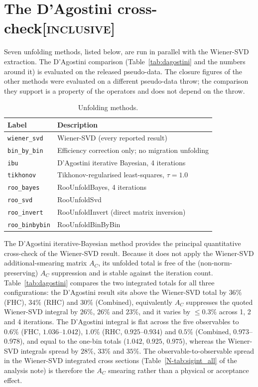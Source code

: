 \documentclass[11pt,a4paper]{article}
\newcommand{\noteref}[2]{#1~\ref{N-#2} of the analysis note}
\newcommand{\scopetag}[1]{\hfill{\normalfont\small\textsc{[#1]}}}
\begin{document}
\section[The D'Agostini cross-check]{The D'Agostini cross-check\scopetag{inclusive}}
\label{sec:crosschecks}

Seven unfolding methods, listed below, are run in parallel with the Wiener-SVD extraction. The D'Agostini comparison (Table~\ref{tab:dagostini} and the
numbers around it) is evaluated on the released pseudo-data. The closure figures of the other
methods were evaluated on a different pseudo-data throw; the comparison they support is a
property of the operators and does not depend on the throw.

\begin{table}[H]
  \centering
  \caption{Unfolding methods.}
  \label{tab:methods}
  \begin{tabular}{ll}
    \toprule
    Label & Description \\
    \midrule
    \texttt{wiener\_svd}   & Wiener-SVD (every reported result) \\
    \texttt{bin\_by\_bin}  & Efficiency correction only; no migration unfolding \\
    \texttt{ibu}           & D'Agostini iterative Bayesian, 4 iterations \\
    \texttt{tikhonov}      & Tikhonov-regularised least-squares, $\tau = 1.0$ \\
    \texttt{roo\_bayes}    & RooUnfoldBayes, 4 iterations \\
    \texttt{roo\_svd}      & RooUnfoldSvd \\
    \texttt{roo\_invert}   & RooUnfoldInvert (direct matrix inversion) \\
    \texttt{roo\_binbybin} & RooUnfoldBinByBin \\
    \bottomrule
  \end{tabular}
\end{table}

The D'Agostini iterative-Bayesian method provides the principal quantitative
cross-check of the Wiener-SVD result. Because it does not apply the Wiener-SVD
additional-smearing matrix $A_C$, its unfolded total is free of the
(non-norm-preserving) $A_C$ suppression and is stable against the iteration count.
Table~\ref{tab:dagostini} compares the two integrated totals for all three
configurations: the D'Agostini result sits above the Wiener-SVD total by
$36\%$ (FHC), $34\%$ (RHC) and $30\%$ (Combined), equivalently $A_C$ suppresses the
quoted Wiener-SVD integral by $26\%$, $26\%$ and $23\%$, and it varies by $\le0.3\%$
across 1, 2 and 4 iterations. The D'Agostini integral is flat across the five observables
to $0.6\%$ (FHC, $1.036$--$1.042$), $1.0\%$ (RHC, $0.925$--$0.934$) and $0.5\%$
(Combined, $0.973$--$0.978$), and equal to the one-bin totals ($1.042$, $0.925$, $0.975$),
whereas the Wiener-SVD integrals spread by $28\%$, $33\%$ and $35\%$.
The observable-to-observable spread in the Wiener-SVD integrated
cross sections (\noteref{Table}{tab:sigint_all}) is therefore the $A_C$ smearing rather than a
physical or acceptance effect.
\end{document}
